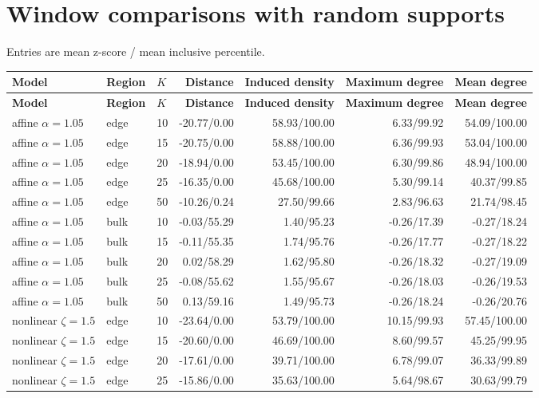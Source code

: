 \documentclass[10pt,letterpaper]{article}
\newcommand{\Hdr}[1]{\cellcolor{navy}\color{white}\bfseries #1}
\begin{document}
\begingroup\section{Window comparisons with random supports}
\scriptsize Entries are mean z-score / mean inclusive percentile.
\begin{longtable}{|l|l|l|r|r|r|r|}\hline
\Hdr{Model} & \Hdr{Region} & \Hdr{$K$} & \Hdr{Distance} & \Hdr{Induced density} & \Hdr{Maximum degree} & \Hdr{Mean degree}\\\hline\endfirsthead
\hline \Hdr{Model} & \Hdr{Region} & \Hdr{$K$} & \Hdr{Distance} & \Hdr{Induced density} & \Hdr{Maximum degree} & \Hdr{Mean degree}\\\hline\endhead
affine $\alpha=1.05$ & edge & 10 & -20.77/0.00 & 58.93/100.00 & 6.33/99.92 & 54.09/100.00 \\\hline
affine $\alpha=1.05$ & edge & 15 & -20.75/0.00 & 58.88/100.00 & 6.36/99.93 & 53.04/100.00 \\\hline
affine $\alpha=1.05$ & edge & 20 & -18.94/0.00 & 53.45/100.00 & 6.30/99.86 & 48.94/100.00 \\\hline
affine $\alpha=1.05$ & edge & 25 & -16.35/0.00 & 45.68/100.00 & 5.30/99.14 & 40.37/99.85 \\\hline
affine $\alpha=1.05$ & edge & 50 & -10.26/0.24 & 27.50/99.66 & 2.83/96.63 & 21.74/98.45 \\\hline
\hline
affine $\alpha=1.05$ & bulk & 10 & -0.03/55.29 & 1.40/95.23 & -0.26/17.39 & -0.27/18.24 \\\hline
affine $\alpha=1.05$ & bulk & 15 & -0.11/55.35 & 1.74/95.76 & -0.26/17.77 & -0.27/18.22 \\\hline
affine $\alpha=1.05$ & bulk & 20 & 0.02/58.29 & 1.62/95.80 & -0.26/18.32 & -0.27/19.09 \\\hline
affine $\alpha=1.05$ & bulk & 25 & -0.08/55.62 & 1.55/95.67 & -0.26/18.03 & -0.26/19.53 \\\hline
affine $\alpha=1.05$ & bulk & 50 & 0.13/59.16 & 1.49/95.73 & -0.26/18.24 & -0.26/20.76 \\\hline
\hline
nonlinear $\zeta=1.5$ & edge & 10 & -23.64/0.00 & 53.79/100.00 & 10.15/99.93 & 57.45/100.00 \\\hline
nonlinear $\zeta=1.5$ & edge & 15 & -20.60/0.00 & 46.69/100.00 & 8.60/99.57 & 45.25/99.95 \\\hline
nonlinear $\zeta=1.5$ & edge & 20 & -17.61/0.00 & 39.71/100.00 & 6.78/99.07 & 36.33/99.89 \\\hline
nonlinear $\zeta=1.5$ & edge & 25 & -15.86/0.00 & 35.63/100.00 & 5.64/98.67 & 30.63/99.79 \\\hline

\end{longtable}
\end{document}
